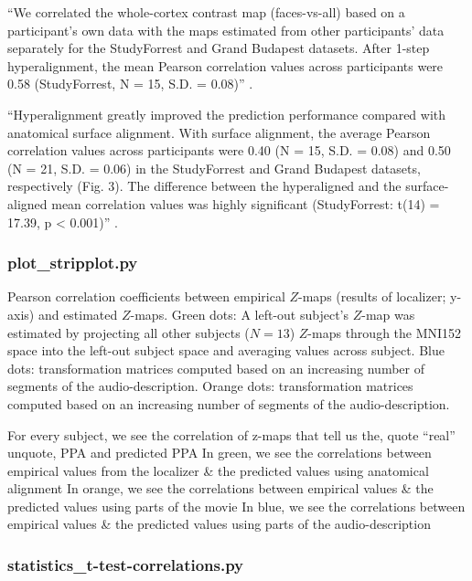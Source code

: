 ``We correlated the whole-cortex contrast map (faces-vs-all) based on a
participant’s own data with the maps estimated from other participants’ data
separately for the StudyForrest and Grand Budapest datasets. After 1-step
hyperalignment, the mean Pearson correlation values across participants were
0.58 (StudyForrest, N = 15, S.D. = 0.08)'' \citep{jiahui2020predicting}.

``Hyperalignment greatly improved the prediction performance compared with
anatomical surface alignment. With surface alignment, the average Pearson
correlation values across participants were 0.40 (N = 15, S.D. = 0.08) and 0.50
(N = 21, S.D. = 0.06) in the StudyForrest and Grand Budapest datasets,
respectively (Fig. 3). The difference between the hyperaligned and the
surface-aligned mean correlation values was highly significant (StudyForrest:
t(14) = 17.39, p < 0.001)'' \citep{jiahui2020predicting}.




\subsubsection{plot\_stripplot.py}

%
Pearson correlation coefficients between empirical $Z$-maps (results of
localizer; y-axis) and estimated $Z$-maps.
%
Green dots: A left-out subject's $Z$-map was estimated by projecting all other
subjects ($N = 13$) $Z$-maps through the MNI152 space into the left-out subject
space and averaging values across subject.
%
Blue dots: transformation matrices computed based on an increasing number of
segments of the audio-description.
%
Orange dots: transformation matrices computed based on an increasing number of
segments of the audio-description.


For every subject, we see the correlation of z-maps that tell us the, quote
``real'' unquote, PPA and predicted PPA
%
In green, we see the correlations between empirical values from the localizer \&
the predicted values using anatomical alignment
%
In orange, we see the correlations between empirical values \& the predicted
values using parts of the movie
%
In blue, we see the correlations between empirical values \& the predicted
values using parts of the audio-description


\subsubsection{statistics\_t-test-correlations.py}

